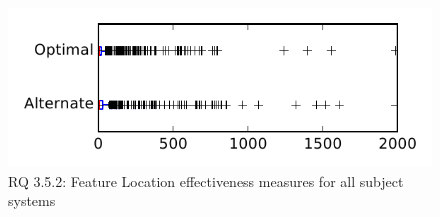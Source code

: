 
\begin{figure}
\centering
\includegraphics[height=0.4\textheight]{figures/combo/flt_rq2_tiny}
\caption{RQ 3.5.2: Feature Location effectiveness measures for all subject systems}
\label{fig:flt:rq2:tiny}
\end{figure}
